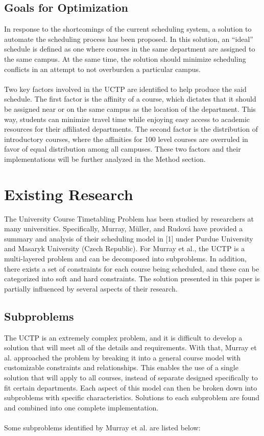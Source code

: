 \documentclass{acm_proc_article-sp}
\begin{document}
	\subsection{Goals for Optimization}
	In response to the shortcomings of the current scheduling system, a solution to
	automate the scheduling process has been proposed. In this solution, an “ideal”
	schedule is defined as one where courses in the same department are assigned to
	the same campus. At the same time, the solution should minimize scheduling
	conflicts in an attempt to not overburden a particular campus. 
	\\\\
	Two key factors involved in the UCTP are identified to help produce the said
	schedule. The first factor is the affinity of a course, which dictates that it
	should be assigned near or on the same campus as the location of the
	department. This way, students can minimize travel time while enjoying easy
	access to academic resources for their affiliated departments. The second
	factor is the distribution of introductory courses, where the affinities for
	100 level courses are overruled in favor of equal distribution among all
	campuses. These two factors and their implementations will be further analyzed
	in the Method section.

\section{Existing Research}
The University Course Timetabling Problem has been studied by researchers at
many universities. Specifically, Murray, Müller, and Rudová have provided a
summary and analysis of their scheduling model in [1] under Purdue University
and Masaryk University (Czech Republic). For Murray et al., the UCTP is a
multi-layered problem and can be decomposed into subproblems. In addition,
there exists a set of constraints for each course being scheduled, and these
can be categorized into soft and hard constraints. The solution presented in
this paper is partially influenced by several aspects of their research.

\subsection{Subproblems}
The UCTP is an extremely complex problem, and it is difficult to develop a
solution that will meet all of the details and requirements. With that, Murray
et al. approached the problem by breaking it into a general course model with
customizable constraints and relationships. This enables the use of a single
solution that will apply to all courses, instead of separate designed
specifically to fit certain departments. Each aspect of this model can then be
broken down into subproblems with specific characteristics. Solutions to each
subproblem are found and combined into one complete implementation.
\\\\
Some subproblems identified by Murray et al. are listed below:
\end{document}
